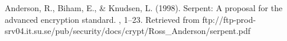 \documentclass[12pt]{article} %
\begin{document}
\begin{thebibliography}{99} %

Anderson, R., Biham, E., \& Knudsen, L. (1998).
\newblock Serpent: A proposal for the advanced encryption standard.
, 1–23. Retrieved from ftp://ftp-prod-srv04.it.su.se/pub/security/docs/crypt/Ross\_Anderson/serpent.pdf

\end{thebibliography}

\end{document}
